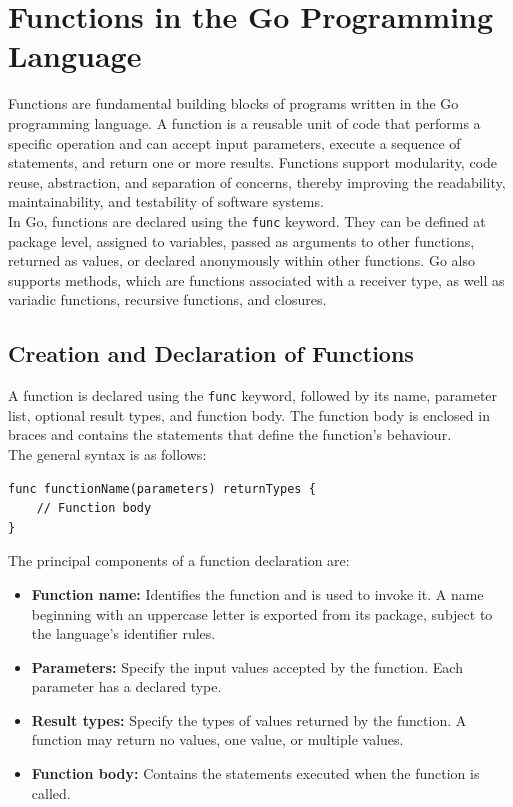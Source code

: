 \section{Functions in the Go Programming Language}

Functions are fundamental building blocks of programs written in the Go programming language. A function is a reusable unit of code that performs a specific operation and can accept input parameters, execute a sequence of statements, and return one or more results. Functions support modularity, code reuse, abstraction, and separation of concerns, thereby improving the readability, maintainability, and testability of software systems.\\

In Go, functions are declared using the \texttt{func} keyword. They can be defined at package level, assigned to variables, passed as arguments to other functions, returned as values, or declared anonymously within other functions. Go also supports methods, which are functions associated with a receiver type, as well as variadic functions, recursive functions, and closures.

\subsection{Creation and Declaration of Functions}

A function is declared using the \texttt{func} keyword, followed by its name, parameter list, optional result types, and function body. The function body is enclosed in braces and contains the statements that define the function's behaviour.\\

The general syntax is as follows:

\begin{lstlisting}
func functionName(parameters) returnTypes {
    // Function body
}
\end{lstlisting}

The principal components of a function declaration are:

\begin{itemize}
    \item \textbf{Function name:} Identifies the function and is used to invoke it. A name beginning with an uppercase letter is exported from its package, subject to the language's identifier rules.
    \item \textbf{Parameters:} Specify the input values accepted by the function. Each parameter has a declared type.
    \item \textbf{Result types:} Specify the types of values returned by the function. A function may return no values, one value, or multiple values.
    \item \textbf{Function body:} Contains the statements executed when the function is called.
\end{itemize}

